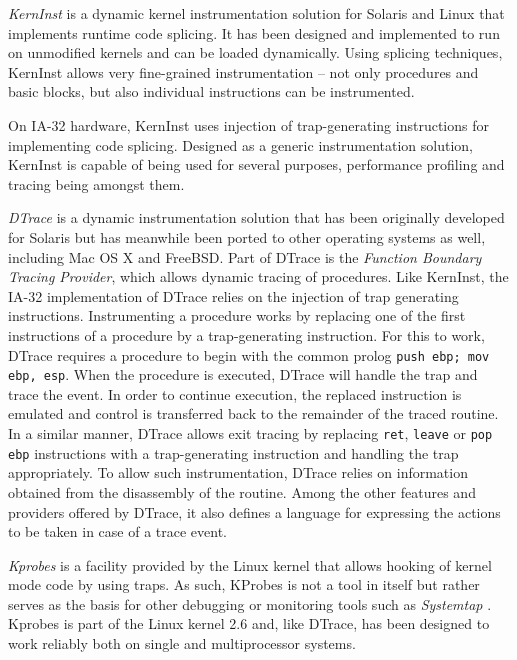 \emph{KernInst} \citep{tamches99finegrained,Tamches01} is a dynamic kernel instrumentation 
solution for Solaris and Linux that implements runtime code splicing. 
It has been designed and implemented to run on
unmodified kernels and can be loaded dynamically. Using splicing techniques, KernInst allows
very fine-grained instrumentation -- not only procedures and basic blocks,
but also individual instructions can be instrumented. 

On IA-32 hardware, KernInst uses injection of trap-generating instructions for 
implementing code splicing. Designed as a generic 
instrumentation solution, KernInst is capable of being used for several purposes, 
performance profiling and tracing being amongst them. 

\emph{DTrace} \cite{Cantrill04} is a dynamic instrumentation solution that has been originally developed 
for Solaris but has meanwhile been ported to other operating systems as well, including
Mac OS X and FreeBSD. Part of DTrace is the \emph{Function Boundary Tracing Provider},
which allows dynamic tracing of procedures. Like KernInst, the IA-32 implementation 
of DTrace relies on the injection of trap generating instructions. Instrumenting
a procedure works by replacing one of the first instructions of a procedure by a 
trap-generating instruction. For this to work, DTrace requires a procedure to begin 
with the common prolog \verb|push ebp; mov ebp, esp|. When the procedure is 
executed, DTrace will handle the trap and trace the event. In order to continue 
execution, the replaced instruction is emulated and control is transferred 
back to the remainder of the traced routine. In a similar 
manner, DTrace allows exit tracing by replacing \verb|ret|, \verb|leave| or \verb|pop ebp|
instructions with a trap-generating instruction and handling the trap appropriately. To allow such 
instrumentation, DTrace relies on information obtained from the disassembly of the routine.
Among the other features and providers offered by DTrace, it also defines a 
language for expressing the actions to be taken in case of a trace event.

\emph{Kprobes} is a facility provided by the Linux kernel that allows hooking of kernel mode
code \cite{Mavinakayanahalli06} by using traps. As such, KProbes is not a tool in itself but rather serves as 
the basis for other debugging or monitoring tools such as \emph{Systemtap} \cite{Prasad05}. 
Kprobes is part of the Linux kernel 2.6 and, like DTrace, has been designed to work reliably both 
on single and multiprocessor systems.



